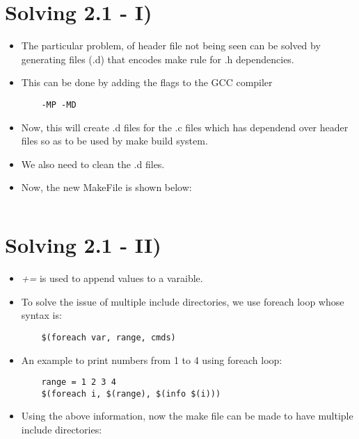 \documentclass{article}
\begin{document}
\section{Solving 2.1 - I)}
\begin{itemize}
    \item The particular problem, of header file not being seen can be solved by generating files (.d) that encodes make rule for .h dependencies.
    \item This can be done by adding the flags to the GCC compiler
          \begin{verbatim}
    -MP -MD
    \end{verbatim}
    \item Now, this will create .d files for the .c files which has dependend over header files so as to be used by make build system.
    \item We also need to clean the .d files.
    \item Now, the new MakeFile is shown below:
\end{itemize}

\inputminted[linenos, breaklines, frame=lines]{make}{./Simple_MakeFileSystem_2_1_I/Makefile}

\section{Solving 2.1 - II)}
\begin{itemize}
    \item \emph{+=} is used to append values to a varaible.
    \item To solve the issue of multiple include directories, we use foreach loop whose syntax is:
          \begin{verbatim}
    $(foreach var, range, cmds)
    \end{verbatim}
    \item An example to print numbers from 1 to 4 using foreach loop:
          \begin{verbatim}
    range = 1 2 3 4
    $(foreach i, $(range), $(info $(i)))
    \end{verbatim}
    \item Using the above information, now the make file can be made to have multiple include directories:
\end{itemize}

\inputminted[linenos, breaklines, frame=lines]{make}{./Simple_MakeFileSystem_2_1_II/Makefile}
\end{document}

